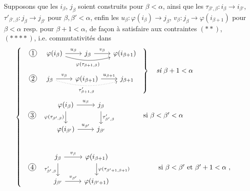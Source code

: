  Supposons que les $i_\beta$, $j_\beta$ soient construits pour $\beta<\alpha$, ainsi que les $\tau_{\beta',\beta}:i_\beta\longrightarrow i_{\beta'}$, $\tau'_{\beta',\beta}:j_\beta\longrightarrow j_{\beta'}$ pour $\beta,\beta'<\alpha$, enfin les $u_\beta:\varphi(i_\beta)\longrightarrow j_\beta$, $v_\beta:j_\beta\longrightarrow\varphi(i_{\beta+1})$ pour $\beta<\alpha$ resp. pour $\beta+1<\alpha$, de façon à satisfaire aux contraintes $(**)$, $(****)$, i.e. commutativités dans
\[
\left\{
\begin{array}{l}
\left.
\begin{array}{ll}
\circled{1} &
\begin{tikzcd}[ampersand replacement=\&]
\varphi(i_\beta) \arrow[r, "u_\beta"] \arrow[rr, bend right=15, "\varphi(\tau_{\beta+1,\beta})"'] \& j_\beta \arrow[r, "v_\beta"] \& \varphi(i_{\beta+1})
\end{tikzcd}
\\[5ex]
\circled{2} &
\begin{tikzcd}[ampersand replacement=\&]
j_\beta \arrow[r, "v_\beta"] \arrow[rr, dotted, bend right=15, "\tau'_{\beta+1,\beta}"'] \& \varphi(i_{\beta+1}) \arrow[r, "u_{\beta+1}"] \& j_{\beta+1}
\end{tikzcd}
\end{array}
\right\}\quad \textit{si}\ \beta+1<\alpha
\\[8ex]
\begin{array}{ll}
\circled{3} &
\begin{tikzcd}[ampersand replacement=\&]
\varphi(i_\beta) \arrow[r, "u_\beta"] \arrow[d, "\varphi(\tau_{\beta',\beta})"'] \& j_\beta \arrow[d, "\tau'_{\beta',\beta}"] \\
\varphi(i_{\beta'}) \arrow[r, "u_{\beta'}"] \& j_{\beta'}
\end{tikzcd}
\qquad\qquad \text{si } \beta<\beta'<\alpha
\end{array}
\\[10ex]
\begin{array}{ll}
\circled{4} &
\begin{tikzcd}[ampersand replacement=\&]
j_\beta \arrow[r, "v_\beta"] \arrow[d, "\tau'_{\beta',\beta}"'] \& \varphi(i_{\beta+1}) \arrow[d, "\varphi(\tau_{\beta'+1,\beta+1})"] \\
j_{\beta'} \arrow[r, "v_{\beta'}"] \& \varphi(i_{\beta'+1})
\end{tikzcd}
\qquad\qquad \text{si } \beta<\beta' \text{ et } \beta'+1<\alpha\ ,
\end{array}
\end{array}
\right.
\]

